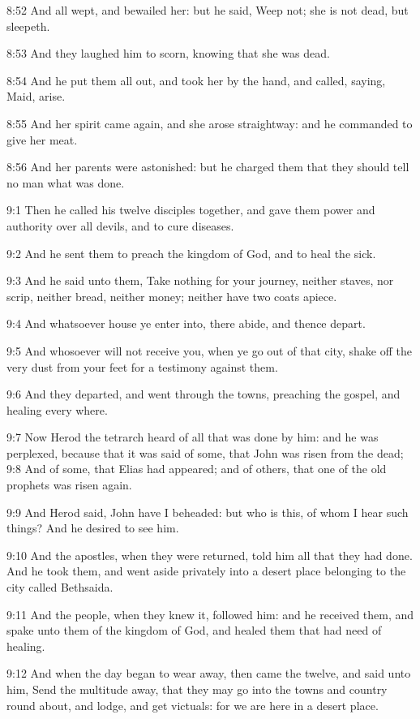 8:52 And all wept, and bewailed her: but he said, Weep not; she is not
dead, but sleepeth.

8:53 And they laughed him to scorn, knowing that she was dead.

8:54 And he put them all out, and took her by the hand, and called,
saying, Maid, arise.

8:55 And her spirit came again, and she arose straightway: and he
commanded to give her meat.

8:56 And her parents were astonished: but he charged them that they
should tell no man what was done.

9:1 Then he called his twelve disciples together, and gave them power
and authority over all devils, and to cure diseases.

9:2 And he sent them to preach the kingdom of God, and to heal the
sick.

9:3 And he said unto them, Take nothing for your journey, neither
staves, nor scrip, neither bread, neither money; neither have two
coats apiece.

9:4 And whatsoever house ye enter into, there abide, and thence
depart.

9:5 And whosoever will not receive you, when ye go out of that city,
shake off the very dust from your feet for a testimony against them.

9:6 And they departed, and went through the towns, preaching the
gospel, and healing every where.

9:7 Now Herod the tetrarch heard of all that was done by him: and he
was perplexed, because that it was said of some, that John was risen
from the dead; 9:8 And of some, that Elias had appeared; and of
others, that one of the old prophets was risen again.

9:9 And Herod said, John have I beheaded: but who is this, of whom I
hear such things? And he desired to see him.

9:10 And the apostles, when they were returned, told him all that they
had done. And he took them, and went aside privately into a desert
place belonging to the city called Bethsaida.

9:11 And the people, when they knew it, followed him: and he received
them, and spake unto them of the kingdom of God, and healed them that
had need of healing.

9:12 And when the day began to wear away, then came the twelve, and
said unto him, Send the multitude away, that they may go into the
towns and country round about, and lodge, and get victuals: for we are
here in a desert place.

